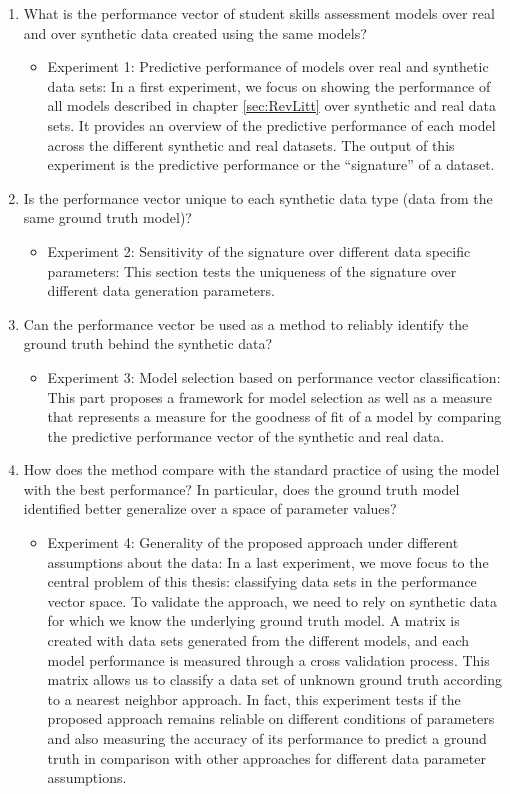 \begin{enumerate}
\item What is the performance vector of student skills assessment models over real and over synthetic data created using the same models?
\begin{itemize}
\item Experiment 1: Predictive performance of models over real and synthetic data sets: In a first experiment, we focus on showing the performance of all models described in chapter \ref{sec:RevLitt} over synthetic and real data sets.  It provides an overview of the predictive performance of each model across the different synthetic and real datasets. The output of this experiment is the predictive performance or the ``signature'' of a dataset.
\end{itemize}
\item Is the performance vector unique to each synthetic data type (data from the same ground truth model)?
\begin{itemize}
\item Experiment 2: Sensitivity of the signature over different data specific parameters: This section tests the uniqueness of the signature over different data generation parameters.
\end{itemize}
\item Can the performance vector be used as a method to reliably identify the ground truth behind the synthetic data?
\begin{itemize}
\item Experiment 3: Model selection based on performance vector classification: This part proposes a framework for model selection as well as a measure that represents a measure for the goodness of fit of a model by comparing the predictive performance vector of the synthetic and real data. 
\end{itemize}
\item How does the method compare with the standard practice of using the model with the best performance?  In particular, does the ground truth model identified better generalize over a space of parameter values?
\begin{itemize}
\item Experiment 4: Generality of the proposed approach under different assumptions about the data: In a last experiment, we move focus to the central problem of this thesis: classifying data sets in the performance vector space.  To validate the approach, we need to rely on synthetic data for which we know the underlying ground truth model.  A matrix is created with data sets generated from the different models, and each model performance is measured through a cross validation process.  This matrix allows us to classify a data set of unknown ground truth according to a nearest neighbor approach. In fact, this experiment tests if the proposed approach remains reliable on different conditions of parameters and also measuring the accuracy of its performance to predict a ground truth in comparison with other approaches for different data parameter assumptions. 
\end{itemize}
\end{enumerate}


